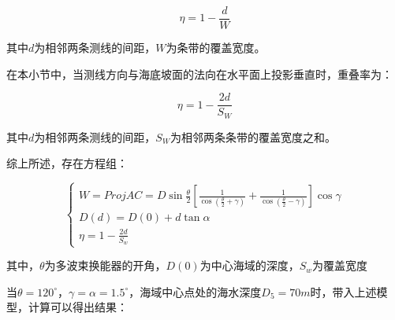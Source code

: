 \begin{equation}
    \eta = 1 - \frac{d}{W}
\end{equation}

其中$d$为相邻两条测线的间距，$W$为条带的覆盖宽度。

在本小节中，当测线方向与海底坡面的法向在水平面上投影垂直时，重叠率为：

\begin{equation}
    \eta = 1-\frac{2d}{S_W}
\end{equation}

其中$d$为相邻两条测线的间距，$S_W$为相邻两条条带的覆盖宽度之和。

综上所述，存在方程组：

\begin{equation}
    \begin{cases}
        W = Proj AC = D \sin\frac{\theta}{2}\left[
            \frac{1}{\cos(\frac{\theta}{2}+\gamma)} +
            \frac{1}{\cos(\frac{\theta}{2}-\gamma)}
        \right] \cos\gamma \\
        D(d) = D(0) + d\tan\alpha \\
        \eta = 1 - \frac{2d}{S_w}
    \end{cases}
\end{equation}

其中，$\theta$为多波束换能器的开角，$D(0)$为中心海域的深度，$S_w$为覆盖宽度

当$\theta = 120^\circ$，$\gamma=\alpha=1.5^\circ$，海域中心点处的海水深度$D_5 = 70m$时，带入上述模型，计算可以得出结果：

\begin{table}[h]
    \centering
    \caption{\textbf{问题1的计算结果(保留两位小数)}}
\end{table}


